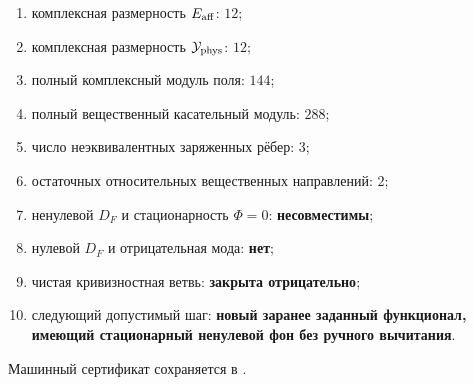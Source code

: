 \begin{protocol}
\begin{enumerate}
 \item комплексная размерность $E_{\rm aff}$: \textbf{$12$};
 \item комплексная размерность $\mathcal Y_{\rm phys}$: \textbf{$12$};
 \item полный комплексный модуль поля: \textbf{$144$};
 \item полный вещественный касательный модуль: \textbf{$288$};
 \item число неэквивалентных заряженных рёбер: \textbf{$3$};
 \item остаточных относительных вещественных направлений: \textbf{$2$};
 \item ненулевой $D_F$ и стационарность $\Phi=0$: \textbf{несовместимы};
 \item нулевой $D_F$ и отрицательная мода: \textbf{нет};
 \item чистая кривизностная ветвь: \textbf{закрыта отрицательно};
 \item следующий допустимый шаг: \textbf{новый заранее заданный функционал,
 имеющий стационарный ненулевой фон без ручного вычитания}.
\end{enumerate}
\end{protocol}

Машинный сертификат сохраняется в
.